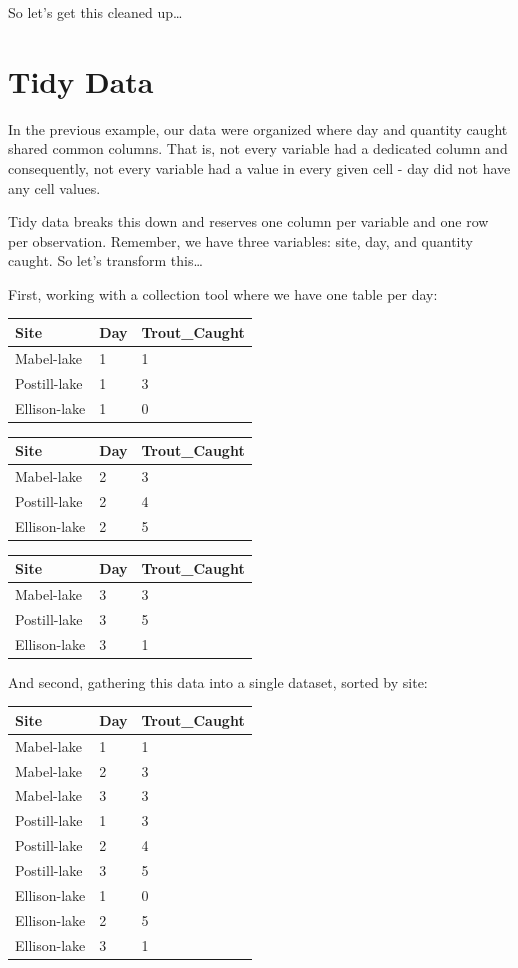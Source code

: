 \documentclass[
]{book}
\begin{document}
So let's get this cleaned up\ldots{}

\hypertarget{tidy-data-1}{%
\section{Tidy Data}\label{tidy-data-1}}

In the previous example, our data were organized where day and quantity caught shared common columns. That is, not every variable had a dedicated column and consequently, not every variable had a value in every given cell - day did not have any cell values.

Tidy data breaks this down and reserves one column per variable and one row per observation. Remember, we have three variables: site, day, and quantity caught. So let's transform this\ldots{}

First, working with a collection tool where we have one table per day:

\begin{longtable}[]{@{}lll@{}}
\toprule
Site & Day & Trout\_Caught \\
\midrule
\endhead
Mabel-lake & 1 & 1 \\
Postill-lake & 1 & 3 \\
Ellison-lake & 1 & 0 \\
\bottomrule
\end{longtable}

\begin{longtable}[]{@{}lll@{}}
\toprule
Site & Day & Trout\_Caught \\
\midrule
\endhead
Mabel-lake & 2 & 3 \\
Postill-lake & 2 & 4 \\
Ellison-lake & 2 & 5 \\
\bottomrule
\end{longtable}

\begin{longtable}[]{@{}lll@{}}
\toprule
Site & Day & Trout\_Caught \\
\midrule
\endhead
Mabel-lake & 3 & 3 \\
Postill-lake & 3 & 5 \\
Ellison-lake & 3 & 1 \\
\bottomrule
\end{longtable}

And second, gathering this data into a single dataset, sorted by site:

\begin{longtable}[]{@{}lll@{}}
\toprule
Site & Day & Trout\_Caught \\
\midrule
\endhead
Mabel-lake & 1 & 1 \\
Mabel-lake & 2 & 3 \\
Mabel-lake & 3 & 3 \\
Postill-lake & 1 & 3 \\
Postill-lake & 2 & 4 \\
Postill-lake & 3 & 5 \\
Ellison-lake & 1 & 0 \\
Ellison-lake & 2 & 5 \\
Ellison-lake & 3 & 1 \\
\bottomrule
\end{longtable}
\end{document}
